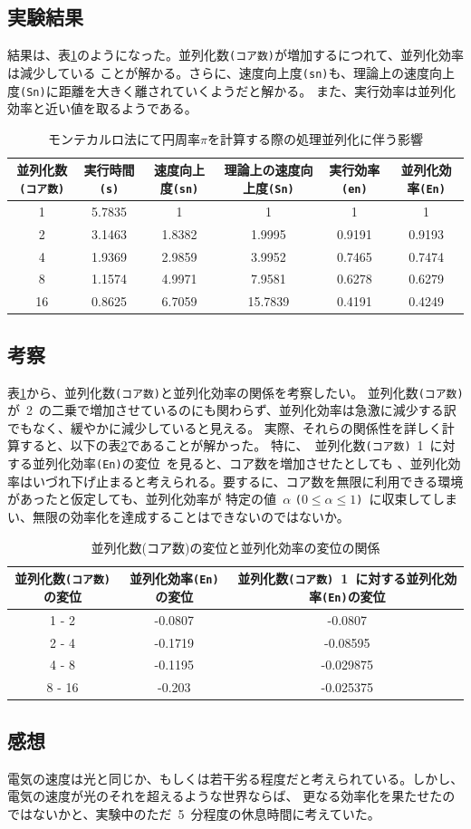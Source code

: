 \documentclass[10pt]{jarticle}
\begin{document}
\subsection{実験結果} \label{sec:5kekka}
%
結果は、表\ref{table:kadai5}のようになった。並列化数\verb|(コア数)|が増加するにつれて、並列化効率は減少している
ことが解かる。さらに、速度向上度\verb|(sn)|も、理論上の速度向上度\verb|(Sn)|に距離を大きく離されていくようだと解かる。
また、実行効率は並列化効率と近い値を取るようである。
%
\begin{table}[htbp]
	\centering
	\caption{モンテカルロ法にて円周率$\pi $を計算する際の処理並列化に伴う影響}
	\label{table:kadai5}
	\begin{tabular}{|c|c|c|c|c|c|}
		\hline
		並列化数\verb|(コア数)| & 実行時間\verb|(s)| & 速度向上度\verb|(sn)| & 理論上の速度向上度\verb|(Sn)| & 実行効率\verb|(en)| & 並列化効率\verb|(En)|\\
		\hline
		1  & 5.7835 & 1      & 1       & 1      & 1      \\
		2  & 3.1463 & 1.8382 & 1.9995  & 0.9191 & 0.9193 \\
		4  & 1.9369 & 2.9859 & 3.9952  & 0.7465 & 0.7474 \\
	  8  & 1.1574 & 4.9971 & 7.9581  & 0.6278 & 0.6279 \\
		16 & 0.8625 & 6.7059 & 15.7839 & 0.4191 & 0.4249 \\
		\hline
	\end{tabular}
\end{table}

\subsection{考察}
%
表\ref{table:kadai5}から、並列化数\verb|(コア数)|と並列化効率の関係を考察したい。
並列化数\verb|(コア数)|が\ 2\ の二乗で増加させているのにも関わらず、並列化効率は急激に減少する訳でもなく、緩やかに減少していると見える。
実際、それらの関係性を詳しく計算すると、以下の表\ref{table:kadai5n}であることが解かった。
特に、\ 並列化数\verb|(コア数)|\ 1\ に対する並列化効率\verb|(En)|の変位\ を見ると、コア数を増加させたとしても
、並列化効率はいづれ下げ止まると考えられる。要するに、コア数を無限に利用できる環境があったと仮定しても、並列化効率が
特定の値\ $\alpha$ \verb|(|$0\le \alpha \le 1 $\verb|)|\ に収束してしまい、無限の効率化を達成することはできないのではないか。
%
\begin{table}[htbp]
	\centering
	\caption{並列化数(コア数)の変位と並列化効率の変位の関係}
	\label{table:kadai5n}
	\begin{tabular}{|c|c|c|}
		\hline
		並列化数\verb|(コア数)|の変位 & 並列化効率\verb|(En)|の変位 & 並列化数\verb|(コア数)|\ 1\ に対する並列化効率\verb|(En)|の変位\\
		\hline
		1 - 2  & -0.0807 & -0.0807   \\
		2 - 4  & -0.1719 & -0.08595  \\
		4 - 8  & -0.1195 & -0.029875 \\
	  8 - 16 & -0.203  & -0.025375 \\
		\hline
	\end{tabular}
\end{table}

\subsection{感想}
%
電気の速度は光と同じか、もしくは若干劣る程度だと考えられている。しかし、電気の速度が光のそれを超えるような世界ならば、
更なる効率化を果たせたのではないかと、実験中のただ\ 5\ 分程度の休息時間に考えていた。
%
\end{document}
